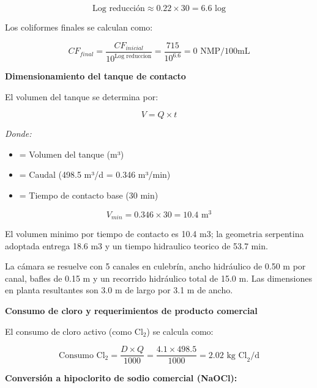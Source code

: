 \documentclass[12pt,a4paper]{article}
\begin{document}
\begin{equation}
\text{Log reducción} \approx 0.22 \times 30 = 6.6 \text{ log}
\end{equation}

Los coliformes finales se calculan como:

\begin{equation}
CF_{final} = \frac{CF_{inicial}}{10^{\text{Log reduccion}}} = \frac{715}{10^{6.6}} = 0 \text{ NMP/100mL}
\end{equation}

\textbf{Dimensionamiento del tanque de contacto}

El volumen del tanque se determina por:

\begin{equation}
V = Q \times t
\end{equation}

\textit{Donde:}
\begin{itemize}[noitemsep,leftmargin=2em]
    \item[$V$] = Volumen del tanque (m³)
    \item[$Q$] = Caudal (498.5 m³/d = 0.346 m³/min)
    \item[$t$] = Tiempo de contacto base (30 min)
\end{itemize}

\begin{equation}
V_{min} = 0.346 \times 30 = 10.4 \text{ m}^3
\end{equation}

El volumen minimo por tiempo de contacto es 10.4 m3; la geometria serpentina adoptada entrega 18.6 m3 y un tiempo hidraulico teorico de 53.7 min.

La cámara se resuelve con 5 canales en culebrín, ancho hidráulico de 0.50 m por canal, bafles de 0.15 m y un recorrido hidráulico total de 15.0 m. Las dimensiones en planta resultantes son 3.0 m de largo por 3.1 m de ancho.

\textbf{Consumo de cloro y requerimientos de producto comercial}

El consumo de cloro activo (como Cl$_2$) se calcula como:

\begin{equation}
\text{Consumo Cl}_2 = \frac{D \times Q}{1000} = \frac{4.1 \times 498.5}{1000} = 2.02 \text{ kg Cl}_2\text{/d}
\end{equation}

\textbf{Conversión a hipoclorito de sodio comercial (NaOCl):}
\end{document}
